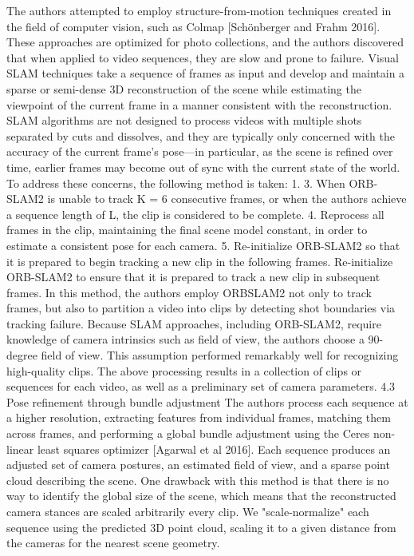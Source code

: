 The authors attempted to employ structure-from-motion techniques created in the field of computer vision, such as Colmap [Schönberger and Frahm 2016].
These approaches are optimized for photo collections, and the authors discovered that when applied to video sequences, they are slow and prone to failure.
Visual SLAM techniques take a sequence of frames as input and develop and maintain a sparse or semi-dense 3D reconstruction of the scene while estimating the viewpoint of the current frame in a manner consistent with the reconstruction.
SLAM algorithms are not designed to process videos with multiple shots separated by cuts and dissolves, and they are typically only concerned with the accuracy of the current frame's pose—in particular, as the scene is refined over time, earlier frames may become out of sync with the current state of the world.
To address these concerns, the following method is taken: 1. 3. When ORB-SLAM2 is unable to track K = 6 consecutive frames, or when the authors achieve a sequence length of L, the clip is considered to be complete.
4. Reprocess all frames in the clip, maintaining the final scene model constant, in order to estimate a consistent pose for each camera.
5. Re-initialize ORB-SLAM2 so that it is prepared to begin tracking a new clip in the following frames.
Re-initialize ORB-SLAM2 to ensure that it is prepared to track a new clip in subsequent frames.
In this method, the authors employ ORBSLAM2 not only to track frames, but also to partition a video into clips by detecting shot boundaries via tracking failure.
Because SLAM approaches, including ORB-SLAM2, require knowledge of camera intrinsics such as field of view, the authors choose a 90-degree field of view.
This assumption performed remarkably well for recognizing high-quality clips.
The above processing results in a collection of clips or sequences for each video, as well as a preliminary set of camera parameters.
4.3 Pose refinement through bundle adjustment The authors process each sequence at a higher resolution, extracting features from individual frames, matching them across frames, and performing a global bundle adjustment using the Ceres non-linear least squares optimizer [Agarwal et al 2016].
Each sequence produces an adjusted set of camera postures, an estimated field of view, and a sparse point cloud describing the scene.
One drawback with this method is that there is no way to identify the global size of the scene, which means that the reconstructed camera stances are scaled arbitrarily every clip.
We "scale-normalize" each sequence using the predicted 3D point cloud, scaling it to a given distance from the cameras for the nearest scene geometry.
